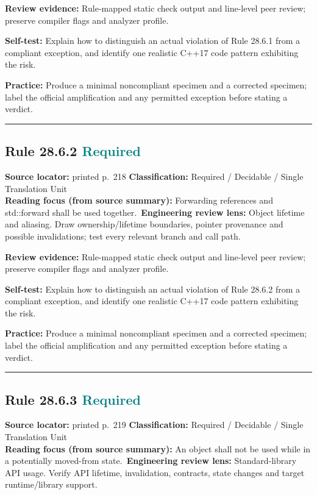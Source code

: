 \documentclass[10pt,letterpaper]{article}
\begin{document}
\textbf{Review evidence:} Rule-mapped static check output and line-level peer review; preserve compiler flags and analyzer profile.

\textbf{Self-test:} Explain how to distinguish an actual violation of Rule 28.6.1 from a compliant exception, and identify one realistic C++17 code pattern exhibiting the risk.\par
\textbf{Practice:} Produce a minimal noncompliant specimen and a corrected specimen; label the official amplification and any permitted exception before stating a verdict.
\smallskip\hrule\smallskip
\subsection*{Rule 28.6.2 \enspace \texorpdfstring{\small\textcolor{teal}{Required}}{Required}}
\noindent\textbf{Source locator:} printed p.~218 \quad\textbf{Classification:} Required / Decidable / Single Translation Unit\\
\textbf{Reading focus (from source summary):} Forwarding references and std::forward shall be used together.\
\textbf{Engineering review lens:} Object lifetime and aliasing. Draw ownership/lifetime boundaries, pointer provenance and possible invalidations; test every relevant branch and call path.

\textbf{Review evidence:} Rule-mapped static check output and line-level peer review; preserve compiler flags and analyzer profile.

\textbf{Self-test:} Explain how to distinguish an actual violation of Rule 28.6.2 from a compliant exception, and identify one realistic C++17 code pattern exhibiting the risk.\par
\textbf{Practice:} Produce a minimal noncompliant specimen and a corrected specimen; label the official amplification and any permitted exception before stating a verdict.
\smallskip\hrule\smallskip
\subsection*{Rule 28.6.3 \enspace \texorpdfstring{\small\textcolor{teal}{Required}}{Required}}
\noindent\textbf{Source locator:} printed p.~219 \quad\textbf{Classification:} Required / Decidable / Single Translation Unit\\
\textbf{Reading focus (from source summary):} An object shall not be used while in a potentially moved-from state.\
\textbf{Engineering review lens:} Standard-library API usage. Verify API lifetime, invalidation, contracts, state changes and target runtime/library support.
\end{document}
